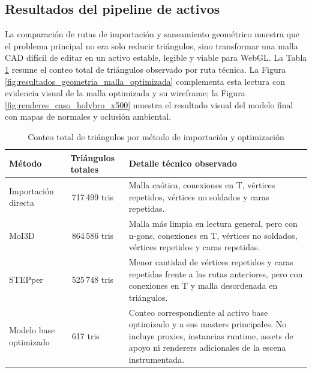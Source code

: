 \subsection{Resultados del pipeline de activos}

La comparación de rutas de importación y saneamiento geométrico muestra que el problema principal no era solo reducir triángulos, sino transformar una malla CAD difícil de editar en un activo estable, legible y viable para WebGL. La Tabla \ref{tab:reduccion_geometrica_modelo_total} resume el conteo total de triángulos observado por ruta técnica. La Figura \ref{fig:resultados_geometria_malla_optimizada} complementa esta lectura con evidencia visual de la malla optimizada y su wireframe; la Figura \ref{fig:renderes_caso_holybro_x500} muestra el resultado visual del modelo final con mapas de normales y oclusión ambiental.

\begin{table}[H]
    \caption{Conteo total de triángulos por método de importación y optimización}
    \label{tab:reduccion_geometrica_modelo_total}
    \centering
    \small
    \begin{tabular}{>{\raggedright\arraybackslash}p{3.7cm}>{\raggedright\arraybackslash}p{2.6cm}>{\raggedright\arraybackslash}p{7.8cm}}
        \hline
        \textbf{Método} & \textbf{Triángulos totales} & \textbf{Detalle técnico observado} \\ \hline
        Importación directa & 6\,717\,499 tris & Malla caótica, conexiones en T, vértices repetidos, vértices no soldados y caras repetidas. \\
        MoI3D & 6\,864\,586 tris & Malla más limpia en lectura general, pero con n-gons, conexiones en T, vértices no soldados, vértices repetidos y caras repetidas. \\
        STEPper & 6\,525\,748 tris & Menor cantidad de vértices repetidos y caras repetidas frente a las rutas anteriores, pero con conexiones en T y malla desordenada en triángulos. \\
        Modelo base optimizado & 95\,617 tris & Conteo correspondiente al activo base optimizado y a sus masters principales. No incluye proxies, instancias runtime, assets de apoyo ni renderers adicionales de la escena instrumentada. \\ \hline
    \end{tabular}
    \par\vspace{0.5\baselineskip}
\end{table}

